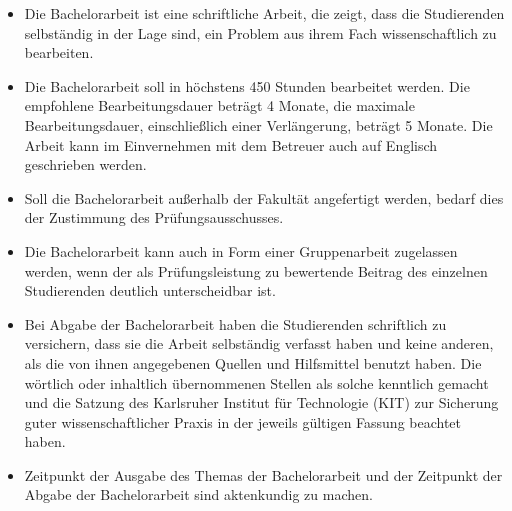 \begin{module}
\begin{content}
\begin{itemize}\item Die Bachelorarbeit ist eine schriftliche Arbeit, die zeigt, dass die Studierenden selbständig in der Lage sind, ein Problem aus ihrem Fach wissenschaftlich zu bearbeiten.  \item Die Bachelorarbeit soll in höchstens 450 Stunden bearbeitet werden. Die empfohlene Bearbeitungsdauer beträgt 4 Monate, die maximale Bearbeitungsdauer, einschließlich einer Verlängerung, beträgt 5 Monate. Die Arbeit kann im Einvernehmen mit dem Betreuer auch auf Englisch geschrieben werden.  \item Soll die Bachelorarbeit außerhalb der Fakultät angefertigt werden, bedarf dies der Zustimmung des Prüfungsausschusses.  \item Die Bachelorarbeit kann auch in Form einer Gruppenarbeit zugelassen werden, wenn der als Prüfungsleistung zu bewertende Beitrag des einzelnen Studierenden deutlich unterscheidbar ist.  \item Bei Abgabe der Bachelorarbeit haben die Studierenden schriftlich zu versichern, dass sie die Arbeit selbständig verfasst haben und keine anderen, als die von ihnen angegebenen Quellen und Hilfsmittel benutzt haben. Die wörtlich oder inhaltlich übernommenen Stellen als solche kenntlich gemacht und die Satzung des Karlsruher Institut für Technologie (KIT) zur Sicherung guter wissenschaftlicher Praxis in der jeweils gültigen Fassung beachtet haben.  \item Zeitpunkt der Ausgabe des Themas der Bachelorarbeit und der Zeitpunkt der Abgabe der Bachelorarbeit sind aktenkundig zu machen.  \end{itemize}
\end{content}



\end{module}

